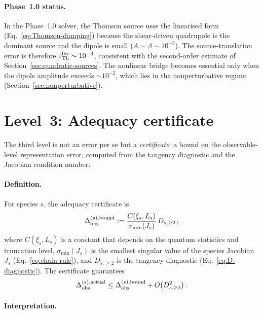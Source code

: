 \paragraph{Phase~1.0 status.}

In the Phase~1.0 solver, the Thomson source uses the
linearised form (Eq.~\ref{eq:Thomson-damping}) because the
shear-driven quadrupole is the dominant source and the
dipole is small ($A \sim \beta \sim 10^{-3}$).  The
source-translation error is therefore
$\varepsilon_{\rm Th}^{\rm lin} \sim 10^{-3}$, consistent
with the second-order estimate of
Section~\ref{sec:quadratic-sources}.  The nonlinear bridge
becomes essential only when the dipole amplitude exceeds
$\sim\!10^{-2}$, which lies in the nonperturbative regime
(Section~\ref{sec:nonperturbative}).


\section{Level~3: Adequacy certificate}
\label{sec:err-adequacy}

The third level is not an error per se but a
\emph{certificate}: a bound on the observable-level
representation error, computed from the tangency diagnostic
and the Jacobian condition number.


\paragraph{Definition.}

For species $s$, the adequacy certificate is
\begin{equation}\label{eq:err-adequacy}
\Delta_{\rm obs}^{(s),\text{bound}}
:= \frac{C(\xi_s, L_s)}
        {\sigma_{\min}(J_s)}\,
  D_{s,\geq 2}\,,
\end{equation}
where $C(\xi_s, L_s)$ is a constant that depends on the
quantum statistics and truncation level,
$\sigma_{\min}(J_s)$ is the smallest singular value of the
species Jacobian $J_s$
(Eq.~\ref{eq:chain-rule}), and $D_{s,\geq 2}$ is the
tangency diagnostic
(Eq.~\ref{eq:D-diagnostic}).  The certificate guarantees
\begin{equation}\label{eq:adequacy-bound}
\Delta_{\rm obs}^{(s),\text{actual}}
\leq \Delta_{\rm obs}^{(s),\text{bound}}
+ O\big(D_{s,\geq 2}^2\big)\,.
\end{equation}


\paragraph{Interpretation.}

